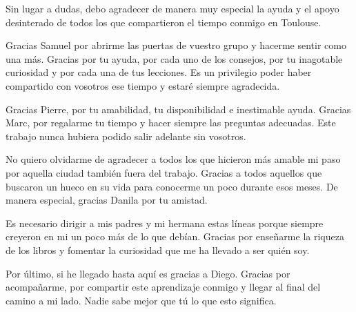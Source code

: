 \starbreak

Sin lugar a dudas, debo agradecer de manera muy especial la ayuda y el apoyo desinterado de todos los que compartieron el tiempo conmigo en Toulouse.

Gracias Samuel por abrirme las puertas de vuestro grupo y hacerme sentir como una más. Gracias por tu ayuda, por cada uno de los consejos, por tu inagotable curiosidad y por cada una de tus lecciones. Es un privilegio poder haber compartido con vosotros ese tiempo y estaré siempre agradecida.


Gracias Pierre, por tu amabilidad, tu disponibilidad e inestimable ayuda. Gracias Marc, por regalarme tu tiempo y hacer siempre las preguntas adecuadas. Este trabajo nunca hubiera podido salir adelante sin vosotros.

No quiero olvidarme de agradecer a todos los que hicieron más amable mi paso por aquella ciudad también fuera del trabajo. Gracias a todos aquellos que buscaron un hueco en su vida para conocerme un poco durante esos meses. De manera especial, gracias Danila por tu amistad.  

\starbreak

Es necesario dirigir a mis padres y mi hermana estas líneas porque siempre creyeron en mi un poco más de lo que debían. Gracias por enseñarme la riqueza de los libros y fomentar la curiosidad que me ha llevado a ser quién soy.

Por último, si he llegado hasta aquí es gracias a Diego. Gracias por acompañarme, por compartir este aprendizaje conmigo y llegar al final del camino a mi lado. Nadie sabe mejor que tú lo que esto significa. 

\starbreak




